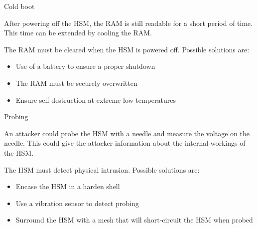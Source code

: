 \begin{frame}{Cold boot}
    \begin{wide}
        \begin{block}[Attack]
            After powering off the HSM, the RAM is still readable for a short period of time. This time can be extended by cooling the RAM.
        \end{block}
        \begin{block}[Defense]
            The RAM must be cleared when the HSM is powered off. Possible solutions are:
            \begin{itemize}
                \item Use of a battery to ensure a proper shutdown
                \item The RAM must be securely overwritten
                \item Ensure self destruction at extreme low temperatures
            \end{itemize}
        \end{block}
    \end{wide}
\end{frame}
\begin{frame}{Probing}
    \begin{wide}
        \begin{block}[Attack]
            An attacker could probe the HSM with a needle and measure the voltage on the needle. This could give the attacker information about the internal workings of the HSM.
        \end{block}
        \begin{block}[Defense]
            The HSM must detect physical intrusion. Possible solutions are:
            \begin{itemize}
                \item Encase the HSM in a harden shell
                \item Use a vibration sensor to detect probing
                \item Surround the HSM with a mesh that will short-circuit the HSM when probed
            \end{itemize}
        \end{block}
    \end{wide}
\end{frame}
